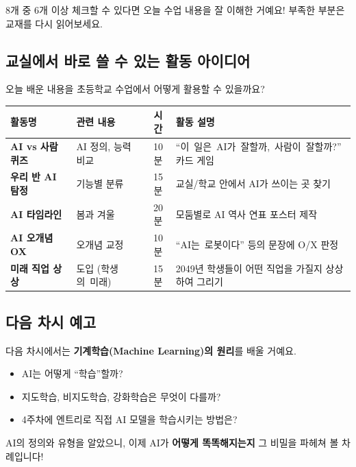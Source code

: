 \documentclass[11pt,a4paper]{article}
\renewcommand{\arraystretch}{1.4}
\begin{document}
8개 중 6개 이상 체크할 수 있다면 오늘 수업 내용을 잘 이해한 거예요! 부족한 부분은 교재를 다시 읽어보세요.

\subsection{교실에서 바로 쓸 수 있는 활동 아이디어}

오늘 배운 내용을 초등학교 수업에서 어떻게 활용할 수 있을까요?

\begin{center}
\renewcommand{\arraystretch}{1.4}
\begin{tabular}{|p{2.3cm}|p{2.2cm}|c|p{6.2cm}|}
\hline
\rowcolor{tableheader}
\textbf{활동명} & \textbf{관련 내용} & \textbf{시간} & \textbf{활동 설명} \\
\hline
\textbf{AI vs 사람 퀴즈} & AI 정의, 능력 비교 & 10분 & \mbox{``이 일은 AI가 잘할까, 사람이 잘할까?''} 카드 게임 \\
\hline
\textbf{우리 반 AI 탐정} & 기능별 분류 & 15분 & 교실/학교 안에서 AI가 쓰이는 곳 찾기 \\
\hline
\textbf{AI 타임라인} & 봄과 겨울 & 20분 & 모둠별로 AI 역사 연표 포스터 제작 \\
\hline
\textbf{AI 오개념 OX} & 오개념 교정 & 10분 & \mbox{``AI는 로봇이다''} 등의 문장에 O/X 판정 \\
\hline
\textbf{미래 직업 상상} & 도입 \mbox{(학생의 미래)} & 15분 & 2049년 학생들이 어떤 직업을 가질지 상상하여 그리기 \\
\hline
\end{tabular}
\end{center}

\subsection{ 다음 차시 예고}

다음 차시에서는 \textbf{기계학습(Machine Learning)의 원리}를 배울 거예요.

\begin{itemize}[leftmargin=*]
    \item AI는 어떻게 ``학습''할까?
    \item 지도학습, 비지도학습, 강화학습은 무엇이 다를까?
    \item 4주차에 엔트리로 직접 AI 모델을 학습시키는 방법은?
\end{itemize}

AI의 정의와 유형을 알았으니, 이제 AI가 \textbf{어떻게 똑똑해지는지} 그 비밀을 파헤쳐 볼 차례입니다!
\end{document}
